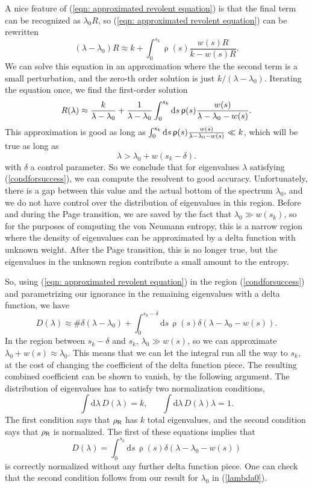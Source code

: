 \documentclass[12pt]{article}
\newcommand{\be}{\begin{equation}}
\newcommand{\ee}{\end{equation}}
\numberwithin{equation}{section}
\begin{document}
A nice feature of (\ref{eqn: approximated revolent equation}) is that the final term can be recognized as $\lambda_0 R$, so (\ref{eqn: approximated revolent equation}) can be rewritten
\be
(\lambda-\lambda_0)R \approx k+ \int_0^{s_k}\uprho(s) \frac{w(s)R}{k - w(s)R}.
\ee
We can solve this equation in an approximation where the the second term is a small perturbation, and the zero-th order solution is just $k / (\lambda-\lambda_0)$. Iterating the equation once, we find the first-order solution
\be
	R(\lambda)\approx {k\over \lambda-\lambda_0}+{1\over \lambda-\lambda_{0}}\int_0^{s_k} \mathrm{d}s\,\uprho(s){w(s)\over \lambda-\lambda_0-w(s)}.
\label{exp:resolvent1}
\ee 
This approximation is good as long as $\int_0^{s_k}\mathrm{d} s\,\uprho(s){w(s)\over \lambda-\lambda_0-w(s)}\ll k$, which will be true as long as 
\be
\lambda > \lambda_0 +  w(s_k-\delta).\label{condforsuccess}
\ee
with $\delta$ a control parameter. So we conclude that for eigenvalues $\lambda$ satisfying  (\ref{condforsuccess}), we can compute the resolvent to good accuracy. Unfortunately, there is a gap between this value and the actual bottom of the spectrum $\lambda_0$, and we do not have control over the distribution of eigenvalues in this region. Before and during the Page transition, we are saved by the fact that $\lambda_0 \gg w(s_k)$, so for the purposes of computing the von Neumann entropy, this is a narrow region where the density of eigenvalues can be approximated by a delta function with unknown weight. After the Page transition, this is no longer true, but the eigenvalues in the unknown region contribute a small amount to the entropy.

So, using (\ref{eqn: approximated revolent equation}) in the region (\ref{condforsuccess}) and parametrizing our ignorance in the remaining eigenvalues with a delta function, we have
\be
D(\lambda) \approx \# \delta(\lambda-\lambda_0) + \int_0^{s_k-\delta}\mathrm{d}s\,\uprho(s)\delta(\lambda-\lambda_0-w(s)).
\ee
In the region between $s_k-\delta$ and $s_k$, $\lambda_0 \gg w(s)$, so we can approximate $\lambda_0 + w(s) \approx \lambda_0$. This means that we can let the integral run all the way to $s_k$, at the cost of changing the coefficient of the delta function piece. The resulting combined coefficient can be shown to vanish, by the following argument. The distribution of eigenvalues has to satisfy two normalization conditions,
\be
\int \mathrm{d}\lambda\,D(\lambda) = k,\hspace{20pt}\int \mathrm{d}\lambda\,D(\lambda)\lambda = 1.
\ee
The first condition says that $\rho_{\sf{R}}$ has $k$ total eigenvalues, and the second condition says that $\rho_{\sf{R}}$ is normalized. The first of these equations implies that
\be
D(\lambda) = \int_0^{s_k}\mathrm{d}s\,\uprho(s)\delta(\lambda-\lambda_0 - w(s))\label{finalD}
\ee
is correctly normalized without any further delta function piece. One can check that the second condition follows from our result for $\lambda_0$ in (\ref{lambda0}).
\end{document}
